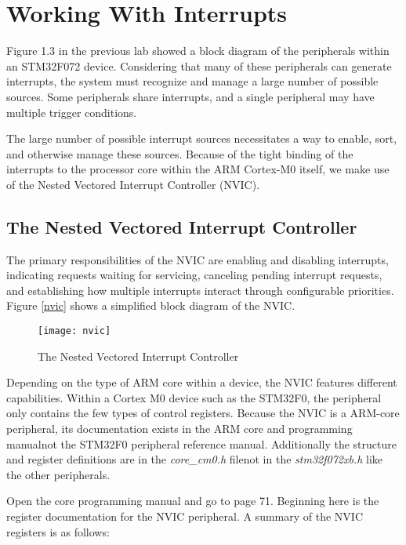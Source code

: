 \documentclass[11pt,fleqn]{book} %
\begin{document}
\section{Working With Interrupts}
Figure 1.3 in the previous lab showed a block diagram of the peripherals within an STM32F072 device. Considering that many of these peripherals can generate interrupts, the system must recognize and manage a large number of possible sources. Some peripherals share interrupts, and a single peripheral may have multiple trigger conditions.  

The large number of possible interrupt sources necessitates a way to enable, sort, and otherwise manage these sources. Because of the tight binding of the interrupts to the processor core within the ARM Cortex-M0 itself, we make use of the Nested Vectored Interrupt Controller (NVIC).

\subsection{The Nested Vectored Interrupt Controller}
The primary responsibilities of the NVIC are enabling and disabling interrupts, indicating requests waiting for servicing, canceling pending interrupt requests, and establishing how multiple interrupts interact through configurable priorities. Figure \vref{nvic} shows a simplified block diagram of the NVIC.
    
\begin{figure}[h]
    \centering\texttt{[image: nvic]}
    \caption{The Nested Vectored Interrupt Controller}
    \label{nvic}
\end{figure}

Depending on the type of ARM core within a device, the NVIC features different capabilities. Within a Cortex M0 device such as the STM32F0, the peripheral only contains the few types of control registers. Because the NVIC is a ARM-core peripheral, its documentation exists in the ARM core and programming manual\textemdash not the STM32F0 peripheral reference manual. Additionally the structure and register definitions are in the \textit{core\_cm0.h} file\textemdash not in the \textit{stm32f072xb.h} like the other peripherals.  

Open the core programming manual and go to page 71. Beginning here is the register documentation for the NVIC peripheral. A summary of the NVIC registers is as follows:
\end{document}
